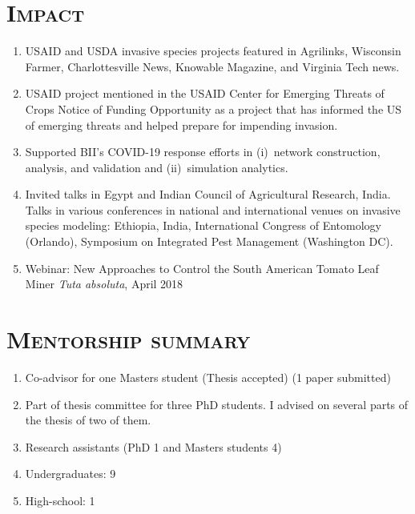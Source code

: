 \documentclass[margin,10pt]{res} %
\begin{document}
\begin{resume}
\section{\textnormal{\textsc{Impact}}}
\begin{enumerate}[$\circ$]
\item USAID and USDA invasive species projects featured in Agrilinks,
Wisconsin Farmer, Charlottesville News, Knowable Magazine, and Virginia
Tech news.
\item USAID project mentioned in the USAID Center for Emerging Threats of
Crops Notice of Funding Opportunity as a project that has informed the US
of emerging threats and helped prepare for impending invasion.
\item Supported BII's COVID-19 response efforts in (i)~network construction,
analysis, and validation and (ii)~simulation analytics. 
\item Invited talks in Egypt and Indian Council of Agricultural Research,
India. Talks in various conferences in national and international venues on
invasive species modeling: Ethiopia, India, International Congress of
Entomology (Orlando), Symposium on Integrated Pest Management (Washington
DC).
\item Webinar: New Approaches to Control the South American Tomato Leaf
Miner \emph{Tuta absoluta}, April 2018
\end{enumerate}

\section{\textnormal{\textsc{Mentorship summary}}}
\begin{enumerate}[$\circ$]
    \item Co-advisor for one Masters student (Thesis accepted) (1 paper
    submitted)
    \item Part of thesis committee for three PhD students. I advised on
    several parts of the thesis of two of them.
    \item Research assistants (PhD 1 and Masters students 4)
    \item Undergraduates: 9
    \item High-school: 1
\end{enumerate}


\end{resume}
\end{document}

